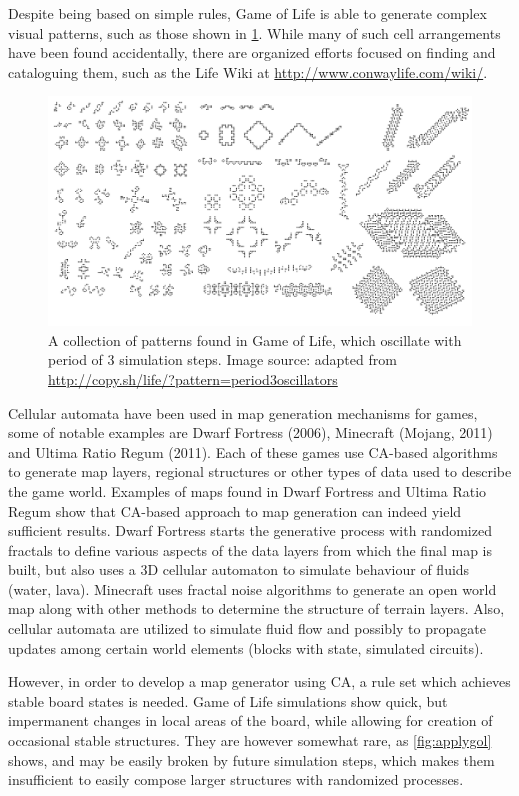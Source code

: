 \documentclass[12pt]{report}
\begin{document}
Despite being based on simple rules, Game of Life is able to generate complex visual patterns, such as those shown in \cref{fig:p3oscillators}. While many of such cell arrangements have been found accidentally, there are organized efforts focused on finding and cataloguing them, such as the Life Wiki at \url{http://www.conwaylife.com/wiki/}. 

\begin{figure}[h]
	\centering
	\includegraphics[width=0.9\linewidth]{images/p3oscillators}
	\caption{A collection of patterns found in Game of Life, which oscillate with period of 3 simulation steps. Image source: adapted from \url{http://copy.sh/life/?pattern=period3oscillators}}
	\label{fig:p3oscillators}
\end{figure}

Cellular automata have been used in map generation mechanisms for games, some of notable examples are Dwarf Fortress (2006),  Minecraft (Mojang, 2011) and Ultima Ratio Regum (2011). Each of these games use CA-based algorithms to generate map layers, regional structures or other types of data used to describe the game world. Examples of maps found in Dwarf Fortress and Ultima Ratio Regum show that CA-based approach to map generation can indeed yield sufficient results. Dwarf Fortress starts the generative process with randomized fractals \autocite{adams2015simulation} to define various aspects of the data layers from which the final map is built, but also uses a 3D cellular automaton to simulate behaviour of fluids (water, lava). Minecraft uses fractal noise algorithms to generate an open world map along with other methods to determine the structure of terrain layers. Also, cellular automata are utilized to simulate fluid flow and possibly to propagate updates among certain world elements (blocks with state, simulated circuits).

However, in order to develop a map generator using CA, a rule set which achieves stable board states is needed. Game of Life simulations show quick, but impermanent changes in local areas of the board, while allowing for creation of occasional stable structures. They are however somewhat rare, as \ref{fig:applygol} shows, and may be easily broken by future simulation steps, which makes them insufficient to easily compose larger structures with randomized processes.
\end{document}
